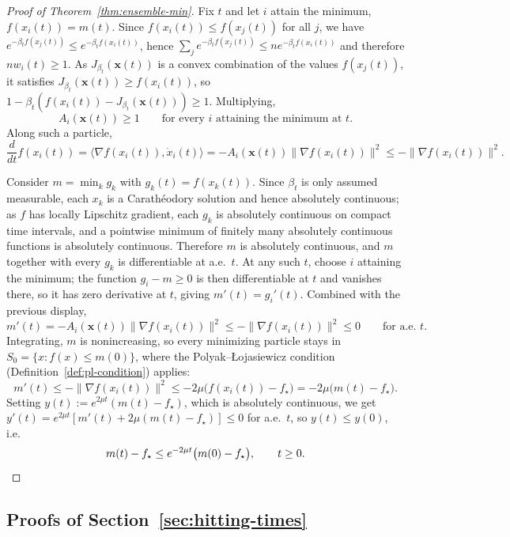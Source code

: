 \documentclass{article}
\theoremstyle{plain}
\theoremstyle{definition}
\theoremstyle{remark}
\newcommand{\prefactor}[2]{A_{#1}(#2)}
\newcommand{\xx}{\mathbf{x}}
\begin{document}
\begin{proof}[Proof of Theorem~\ref{thm:ensemble-min}]
    Fix $t$ and let $i$ attain the minimum, $f(x_i(t))=m(t)$. Since $f(x_i(t))\le f(x_j(t))$ for all $j$, we have $e^{-\beta_tf(x_j(t))}\le e^{-\beta_tf(x_i(t))}$, hence $\sum_je^{-\beta_tf(x_j(t))}\le ne^{-\beta_tf(x_i(t))}$ and therefore $nw_i(t)\ge1$. As $J_{\beta_t}(\xx(t))$ is a convex combination of the values $f(x_j(t))$, it satisfies $J_{\beta_t}(\xx(t))\ge f(x_i(t))$, so $1-\beta_t(f(x_i(t))-J_{\beta_t}(\xx(t)))\ge1$. Multiplying,
    \begin{equation}
        \prefactor{i}{\xx(t)}\ge1 \qquad \text{for every } i \text{ attaining the minimum at } t.
        \label{eq:ai-ge-1}
    \end{equation}
    Along such a particle,
    \[
        \frac{d}{dt}f(x_i(t)) = \langle\nabla f(x_i(t)),\dot x_i(t)\rangle = -\prefactor{i}{\xx(t)}\|\nabla f(x_i(t))\|^2 \le -\|\nabla f(x_i(t))\|^2.
    \]

    Consider $m=\min_k g_k$ with $g_k(t)=f(x_k(t))$. Since $\beta_t$ is only assumed measurable, each $x_k$ is a Carath\'eodory solution and hence absolutely continuous; as $f$ has locally Lipschitz gradient, each $g_k$ is absolutely continuous on compact time intervals, and a pointwise minimum of finitely many absolutely continuous functions is absolutely continuous. Therefore $m$ is absolutely continuous, and $m$ together with every $g_k$ is differentiable at a.e.\ $t$. At any such $t$, choose $i$ attaining the minimum; the function $g_i-m\ge0$ is then differentiable at $t$ and vanishes there, so it has zero derivative at $t$, giving $m'(t)=g_i'(t)$. Combined with the previous display,
    \[
        m'(t)=-\prefactor{i}{\xx(t)}\|\nabla f(x_i(t))\|^2\le-\|\nabla f(x_i(t))\|^2\le0 \qquad \text{for a.e. } t.
    \]
    Integrating, $m$ is nonincreasing, so every minimizing particle stays in $S_0=\{x:f(x)\le m(0)\}$, where the Polyak--\L{}ojasiewicz condition (Definition~\ref{def:pl-condition}) applies:
    \[
        m'(t)\le-\|\nabla f(x_i(t))\|^2\le-2\mu\bigl(f(x_i(t))-f_\star\bigr)=-2\mu\bigl(m(t)-f_\star\bigr).
    \]
    Setting $y(t):=e^{2\mu t}(m(t)-f_\star)$, which is absolutely continuous, we get $y'(t)=e^{2\mu t}[m'(t)+2\mu(m(t)-f_\star)]\le0$ for a.e.\ $t$, so $y(t)\le y(0)$, i.e.
    \[
        m(t)-f_\star\le e^{-2\mu t}\bigl(m(0)-f_\star\bigr), \qquad t\ge0. \qedhere
    \]
\end{proof}

\subsection{Proofs of Section~\ref{sec:hitting-times}}
\end{document}
